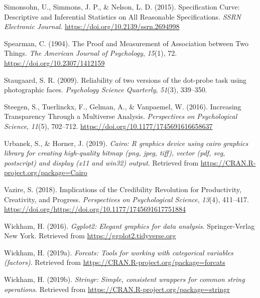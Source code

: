 \documentclass[english,man,floatsintext]{apa6}
\begin{document}
\leavevmode\hypertarget{ref-simonsohn_specification_2015}{}%
Simonsohn, U., Simmons, J. P., \& Nelson, L. D. (2015). Specification Curve: Descriptive and Inferential Statistics on All Reasonable Specifications. \emph{SSRN Electronic Journal}. \url{https://doi.org/10.2139/ssrn.2694998}

\leavevmode\hypertarget{ref-spearman_proof_1904}{}%
Spearman, C. (1904). The Proof and Measurement of Association between Two Things. \emph{The American Journal of Psychology}, \emph{15}(1), 72. \url{https://doi.org/10.2307/1412159}

\leavevmode\hypertarget{ref-staugaard_reliability_2009}{}%
Staugaard, S. R. (2009). Reliability of two versions of the dot-probe task using photographic faces. \emph{Psychology Science Quarterly}, \emph{51}(3), 339--350.

\leavevmode\hypertarget{ref-steegen_increasing_2016}{}%
Steegen, S., Tuerlinckx, F., Gelman, A., \& Vanpaemel, W. (2016). Increasing Transparency Through a Multiverse Analysis. \emph{Perspectives on Psychological Science}, \emph{11}(5), 702--712. \url{https://doi.org/10.1177/1745691616658637}

\leavevmode\hypertarget{ref-R-Cairo}{}%
Urbanek, S., \& Horner, J. (2019). \emph{Cairo: R graphics device using cairo graphics library for creating high-quality bitmap (png, jpeg, tiff), vector (pdf, svg, postscript) and display (x11 and win32) output}. Retrieved from \url{https://CRAN.R-project.org/package=Cairo}

\leavevmode\hypertarget{ref-vazire_implications_2018}{}%
Vazire, S. (2018). Implications of the Credibility Revolution for Productivity, Creativity, and Progress. \emph{Perspectives on Psychological Science}, \emph{13}(4), 411--417. \url{https://doi.org/https://doi.org/10.1177/1745691617751884}

\leavevmode\hypertarget{ref-R-ggplot2}{}%
Wickham, H. (2016). \emph{Ggplot2: Elegant graphics for data analysis}. Springer-Verlag New York. Retrieved from \url{https://ggplot2.tidyverse.org}

\leavevmode\hypertarget{ref-R-forcats}{}%
Wickham, H. (2019a). \emph{Forcats: Tools for working with categorical variables (factors)}. Retrieved from \url{https://CRAN.R-project.org/package=forcats}

\leavevmode\hypertarget{ref-R-stringr}{}%
Wickham, H. (2019b). \emph{Stringr: Simple, consistent wrappers for common string operations}. Retrieved from \url{https://CRAN.R-project.org/package=stringr}
\end{document}
